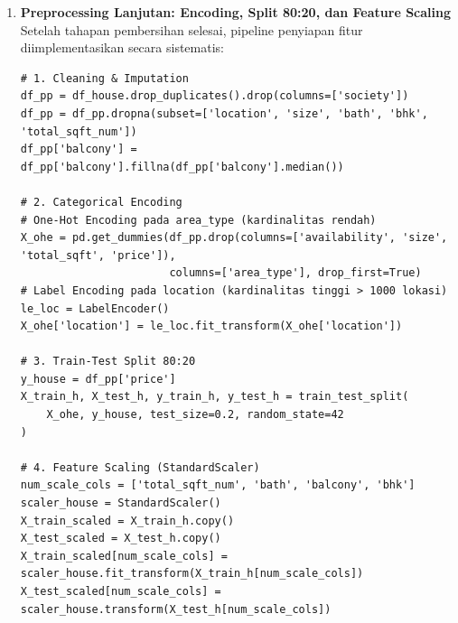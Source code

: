 \documentclass[a4paper,oneside,12pt]{report}
\begin{document}
\begin{enumerate}
    \textit{Penjelasan Tindakan Penanganan Data:}
    \begin{enumerate}
        \item \textbf{Data Duplikat (568 baris)}: Baris duplikat dihapus menggunakan \texttt{drop\_duplicates()} guna menghindari pembobotan sampel yang berlebihan saat melatih model.
        \item \textbf{Fitur \texttt{society} (5.502 data kosong $\approx 41.3\%$)}: Kolom ini di-drop sepenuhnya karena porsi kekosongan melebihi 40\%, sehingga imputasi buatan justru berisiko merusak integritas data.
        \item \textbf{Fitur \texttt{balcony} (605 data kosong)}: Karena bertipe numerik diskrit dengan sebaran miring, nilai kosong diisi menggunakan nilai tengah (\textit{median}).
        \item \textbf{Fitur \texttt{location}, \texttt{size}, \texttt{bath} (missing $< 1\%$)}: Karena persentase nilai kosong sangat rendah terhadap total dataset, baris yang tidak lengkap pada kolom-kolom ini dieliminasi dengan \texttt{dropna()}.
    \end{enumerate}

    \item \textbf{Preprocessing Lanjutan: Encoding, Split 80:20, dan Feature Scaling} \\
    Setelah tahapan pembersihan selesai, pipeline penyiapan fitur diimplementasikan secara sistematis:
\begin{lstlisting}[style=pythonstyle, caption=Pipeline Preprocessing Lengkap Dataset Bengaluru]
# 1. Cleaning & Imputation
df_pp = df_house.drop_duplicates().drop(columns=['society'])
df_pp = df_pp.dropna(subset=['location', 'size', 'bath', 'bhk', 'total_sqft_num'])
df_pp['balcony'] = df_pp['balcony'].fillna(df_pp['balcony'].median())

# 2. Categorical Encoding
# One-Hot Encoding pada area_type (kardinalitas rendah)
X_ohe = pd.get_dummies(df_pp.drop(columns=['availability', 'size', 'total_sqft', 'price']), 
                       columns=['area_type'], drop_first=True)
# Label Encoding pada location (kardinalitas tinggi > 1000 lokasi)
le_loc = LabelEncoder()
X_ohe['location'] = le_loc.fit_transform(X_ohe['location'])

# 3. Train-Test Split 80:20
y_house = df_pp['price']
X_train_h, X_test_h, y_train_h, y_test_h = train_test_split(
    X_ohe, y_house, test_size=0.2, random_state=42
)

# 4. Feature Scaling (StandardScaler)
num_scale_cols = ['total_sqft_num', 'bath', 'balcony', 'bhk']
scaler_house = StandardScaler()
X_train_scaled = X_train_h.copy()
X_test_scaled = X_test_h.copy()
X_train_scaled[num_scale_cols] = scaler_house.fit_transform(X_train_h[num_scale_cols])
X_test_scaled[num_scale_cols] = scaler_house.transform(X_test_h[num_scale_cols])
\end{lstlisting}


\end{enumerate}
\end{document}
